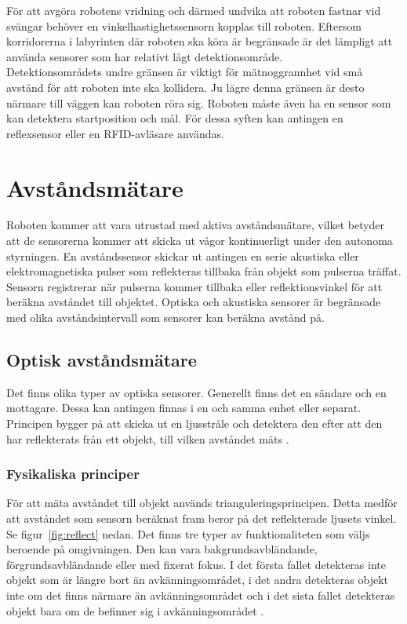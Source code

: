 \documentclass[11pt]{article}
\begin{document}
\begin{flushleft}
För att avgöra robotens vridning och därmed undvika att roboten fastnar vid svängar behöver en vinkelhastighetssensorn kopplas till roboten. Eftersom korridorerna i labyrinten där roboten ska köra är begränsade är det lämpligt att använda sensorer som har relativt lågt detektionsområde. 
\\[0.1in]

Detektionsområdets undre gränsen är viktigt för mätnoggrannhet vid små avstånd för att roboten inte ska kollidera. Ju lägre denna gränsen är desto närmare till väggen kan roboten röra sig.  Roboten måste även ha en sensor som kan detektera startposition och mål. För dessa syften kan antingen en reflexsensor eller en RFID-avläsare användas.
\\[0.1in]


\section{Avståndsmätare}
Roboten kommer att vara utrustad med aktiva avståndsmätare, vilket betyder att de sensorerna kommer att skicka ut vågor kontinuerligt under den autonoma styrningen. En avståndssensor skickar ut antingen en serie akustiska eller elektromagnetiska pulser som reflekteras tillbaka från objekt som pulserna träffat. Sensorn registrerar när pulserna kommer tillbaka eller reflektionsvinkel för att beräkna avståndet till objektet. Optiska och akustiska sensorer är begränsade med olika avståndsintervall som sensorer kan beräkna avstånd på.
 
\subsection{Optisk avståndsmätare}
Det finns olika typer av optiska sensorer. Generellt finns det en sändare och en mottagare. Dessa kan antingen finnas i en och samma enhet eller separat. Principen bygger på att skicka ut en ljusstråle och detektera den efter att den har reflekterats från ett objekt, till vilken avståndet mäts \autocite{Fotoceller}.

\pagebreak

\subsubsection{Fysikaliska principer} 
För att mäta avståndet till objekt används trianguleringsprincipen. Detta medför att avståndet som sensorn beräknat fram beror på det reflekterade ljusets vinkel. Se figur~\ref{fig:reflect} nedan. Det finns tre typer av funktionaliteten som väljs beroende på omgivningen. Den kan vara bakgrundsavbländande, förgrundsavbländande eller med fixerat fokus. I det första fallet detekteras inte objekt som är längre bort än avkänningsområdet, i det andra detekteras objekt inte om det finns närmare än avkänningsområdet och i det sista fallet detekteras objekt bara om de befinner sig i avkänningsområdet \autocite{Fotoceller}.


\end{flushleft}
\end{document}
